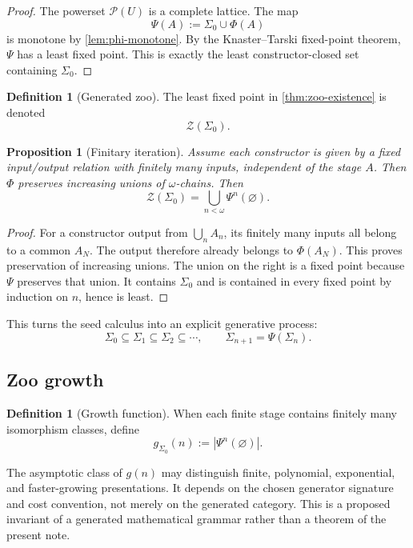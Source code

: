 \documentclass[11pt]{article}
\newtheorem{proposition}[theorem]{Proposition}
\theoremstyle{definition}
\newtheorem{definition}[theorem]{Definition}
\theoremstyle{remark}
\newcommand{\Zoo}{\mathcal Z}
\newcommand{\Seeds}{\Sigma}
\begin{document}
\begin{proof}
The powerset $\mathcal P(U)$ is a complete lattice. The map
\[
\Psi(A):=\Seeds_0\cup\Phi(A)
\]
is monotone by \cref{lem:phi-monotone}. By the Knaster--Tarski fixed-point theorem, $\Psi$ has a least fixed point. This is exactly the least constructor-closed set containing $\Seeds_0$.
\end{proof}

\begin{definition}[Generated zoo]
The least fixed point in \cref{thm:zoo-existence} is denoted
\[
\Zoo(\Seeds_0).
\]
\end{definition}

\begin{proposition}[Finitary iteration]\label{prop:finitary}
Assume each constructor is given by a fixed input/output relation with finitely many inputs, independent of the stage $A$. Then $\Phi$ preserves increasing unions of $\omega$-chains. Then
\[
\Zoo(\Seeds_0)
=
\bigcup_{n<\omega}\Psi^n(\varnothing).
\]
\end{proposition}

\begin{proof}
For a constructor output from $\bigcup_n A_n$, its finitely many inputs all belong to a common $A_N$. The output therefore already belongs to $\Phi(A_N)$. This proves preservation of increasing unions. The union on the right is a fixed point because $\Psi$ preserves that union. It contains $\Seeds_0$ and is contained in every fixed point by induction on $n$, hence is least.
\end{proof}

This turns the seed calculus into an explicit generative process:
\[
\Seeds_0
\subseteq
\Seeds_1
\subseteq
\Seeds_2
\subseteq\cdots,
\qquad
\Seeds_{n+1}=\Psi(\Seeds_n).
\]

\subsection{Zoo growth}

\begin{definition}[Growth function]
When each finite stage contains finitely many isomorphism classes, define
\[
g_{\Seeds_0}(n):=|\Psi^n(\varnothing)|.
\]
\end{definition}

The asymptotic class of $g(n)$ may distinguish finite, polynomial, exponential, and faster-growing presentations. It depends on the chosen generator signature and cost convention, not merely on the generated category. This is a proposed invariant of a generated mathematical grammar rather than a theorem of the present note.
\end{document}
